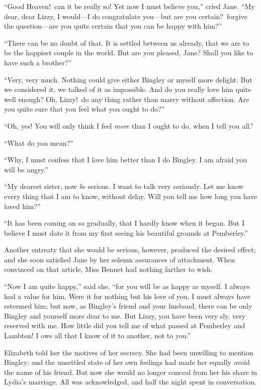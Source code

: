 \documentclass[12pt,english]{book}
\begin{document}
{}``Good Heaven!\ can it be really so! Yet now I must believe you,''
cried Jane. {}``My dear, dear Lizzy, I would\mbox{---}I do congratulate
you\mbox{---}but are you certain?\ forgive the question\mbox{---}are
you quite certain that you can be happy with him?''

{}``There can be no doubt of that. It is settled between us already,
that we are to be the happiest couple in the world. But are you pleased,
Jane? Shall you like to have such a brother?''

{}``Very, very much. Nothing could give either Bingley or myself
more delight. But we considered it, we talked of it as impossible.
And do you really love him quite well enough? Oh, Lizzy!\ do any
thing rather than marry without affection. Are you quite sure that
you feel what you ought to do?''

{}``Oh, yes! You will only think I feel \textit{more} than I ought
to do, when I tell you all.''

{}``What do you mean?''

{}``Why, I must confess that I love him better than I do Bingley.
I am afraid you will be angry.''

{}``My dearest sister, now \textit{be} serious. I want to talk very
seriously. Let me know every thing that I am to know, without delay.
Will you tell me how long you have loved him?''\


{}``It has been coming on so gradually, that I hardly know when it
began. But I believe I must date it from my first seeing his beautiful
grounds at Pemberley.''

Another entreaty that she would be serious, however, produced the
desired effect; and she soon satisfied Jane by her solemn assurances
of attachment. When convinced on that article, Miss Bennet had nothing
farther to wish.

{}``Now I am quite happy,'' said she, {}``for you will be as happy
as myself. I always had a value for him. Were it for nothing but his
love of you, I must always have esteemed him; but now, as Bingley's
friend and your husband, there can be only Bingley and yourself more
dear to me. But Lizzy, you have been very sly, very reserved with
me. How little did you tell me of what passed at Pemberley and Lambton!
I owe all that I know of it to another, not to you.''

Elizabeth told her the motives of her secrecy. She had been unwilling
to mention Bingley; and the unsettled state of her own feelings had
made her equally avoid the name of his friend. But now she would no
longer conceal from her his share in Lydia's marriage. All was acknowledged,
and half the night spent in conversation.
\end{document}
